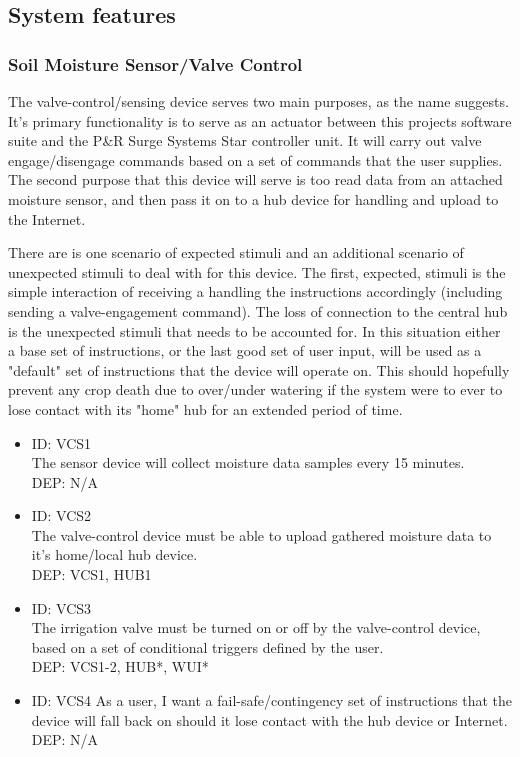 \documentclass[onecolumn, draftclsnofoot,10pt, compsoc]{IEEEtran}
\newcounter{subsubsubsection}[subsubsection]
\newcounter{subsubsubsubsection}[subsubsubsection]
\begin{document}
	
	\subsection{System features}
	\subsubsection{Soil Moisture Sensor/Valve Control}
	The valve-control/sensing device serves two main purposes, as the name suggests.
	It's primary functionality is to serve as an actuator between this projects software suite and the P\&R Surge Systems Star controller unit.
	It will carry out valve engage/disengage commands based on a set of commands that the user supplies.
	The second purpose that this device will serve is too read data from an attached moisture sensor, and then pass it on to a hub device for handling and upload to the Internet.
	
	There are is one scenario of expected stimuli and an additional scenario of unexpected stimuli to deal with for this device.
	The first, expected, stimuli is the simple interaction of receiving a handling the instructions accordingly (including sending a valve-engagement command).
	The loss of connection to the central hub is the unexpected stimuli that needs to be accounted for.
	In this situation either a base set of instructions, or the last good set of user input, will be used as a "default" set of instructions that the device will operate on.
	This should hopefully prevent any crop death due to over/under watering if the system were to ever to lose contact with its "home" hub for an extended period of time.            
	\begin{itemize}
		\item[]{
			ID: VCS1\\
			The sensor device will collect moisture data samples every 15 minutes.\\
			DEP: N/A
		}
		
		\item[]{
			ID: VCS2\\
			The valve-control device must be able to upload gathered moisture data to it's home/local hub device.\\
			DEP: VCS1, HUB1
		}
		
		\item[]{
			ID: VCS3\\
			The irrigation valve must be turned on or off by the valve-control device, based on a set of conditional triggers defined by the user.\\
			DEP: VCS1-2, HUB*, WUI*
		}
		
		\item[]{
			ID: VCS4
			As a user, I want a fail-safe/contingency set of instructions that the device will fall back on should it lose contact with the hub device or Internet.
			DEP: N/A
		}
		
	\end{itemize}    
	
\end{document}
